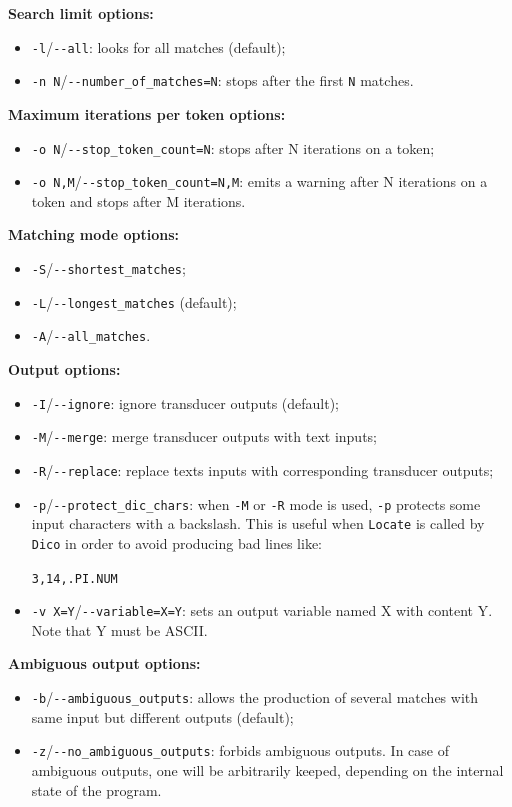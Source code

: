 \bigskip
\noindent \textbf{Search limit options:}
\begin{itemize}
  \item \verb+-l+/\verb+--all+: looks for all matches (default);
  \item \verb+-n N+/\verb+--number_of_matches=N+: stops after the first
  \verb+N+ matches.
\end{itemize}

\bigskip
\noindent \textbf{Maximum iterations per token options:}
\begin{itemize}
  \item \verb+-o N+/\verb+--stop_token_count=N+: stops after N iterations on a token;
  \item \verb+-o N,M+/\verb+--stop_token_count=N,M+: emits a warning after N iterations on a token and stops after M iterations.
\end{itemize}

\bigskip
\noindent \textbf{Matching mode options:}
\begin{itemize}
  \item \verb+-S+/\verb+--shortest_matches+;
  \item \verb+-L+/\verb+--longest_matches+ (default);
  \item \verb+-A+/\verb+--all_matches+.
\end{itemize}

\bigskip
\noindent \textbf{Output options:}
\begin{itemize}
  \item \verb+-I+/\verb+--ignore+: ignore transducer outputs (default);
  \item \verb+-M+/\verb+--merge+: merge transducer outputs with text inputs;
  \item \verb+-R+/\verb+--replace+: replace texts inputs with corresponding
  transducer outputs;
  \item \verb+-p+/\verb+--protect_dic_chars+: when \verb+-M+ or \verb+-R+ mode is
  used, \verb+-p+ protects some input characters with a backslash. This is useful
  when \verb+Locate+ is called by \verb+Dico+ in order to avoid producing bad
  lines like:
  
  \verb+3,14,.PI.NUM+
  \item \verb+-v X=Y+/\verb+--variable=X=Y+: sets an output variable named X with content Y. 
  Note that Y must be ASCII.
\end{itemize}

\bigskip
\noindent \textbf{Ambiguous output options:}
\begin{itemize}
  \item \verb+-b+/\verb+--ambiguous_outputs+: allows the production of several 
  matches with same input but different outputs (default);
  \item \verb+-z+/\verb+--no_ambiguous_outputs+: forbids ambiguous outputs. In
  case of ambiguous outputs, one will be arbitrarily keeped, depending on the
  internal state of the program.
\end{itemize}

